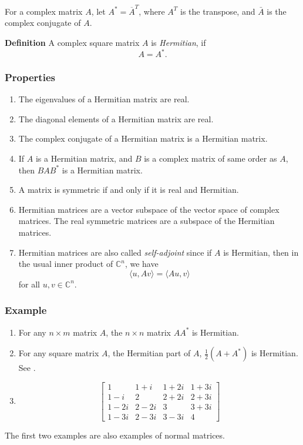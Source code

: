 \documentclass[12pt]{article}
\begin{document}
For a complex matrix $A$, let $A^\ast=\overline{A}^{T}$, where 
$A^T$ is the transpose, and $\bar{A}$ is the complex conjugate of $A$.

{\bf Definition}
A complex square matrix $A$ is \emph{Hermitian}, if 
$$ A = A^*. $$

\subsubsection*{Properties}
\begin{enumerate}
\item The eigenvalues of a Hermitian matrix are real.
\item The diagonal elements of a Hermitian matrix are real.
\item The complex conjugate of a Hermitian matrix is a Hermitian matrix.
\item If $A$ is a Hermitian matrix, and $B$ is a complex matrix
of same order as $A$, then $BAB^\ast$ is a Hermitian matrix.
\item A matrix is symmetric if and only if it is real and Hermitian.
\item Hermitian matrices are a vector subspace of the vector space of 
complex matrices. 
The real symmetric matrices are a subspace of the Hermitian matrices.
\item Hermitian matrices are also called \emph{self-adjoint} since if $A$ is
Hermitian, then in the usual
inner product of $\mathbb{C}^n$, we have 
$$ \langle u,Av \rangle = \langle Au,v\rangle$$
for all $u,v\in \mathbb{C}^n$.

\end{enumerate}

\subsubsection*{Example}
\begin{enumerate}
\item For any $n\times m$ matrix $A$, the $n\times n$ matrix $A A^\ast$ is
Hermitian. 
\item For any square matrix $A$, the Hermitian part of $A$,  
      $\frac{1}{2}(A+A^\ast)$ is Hermitian. 
      See .
\item 
$$ \begin{bmatrix}
  1 & 1 + i & 1 + 2i & 1 + 3i \\
  1 - i & 2 & 2 + 2i & 2 + 3i \\
  1 - 2i & 2 - 2i & 3 & 3 + 3i \\
  1 - 3i & 2 - 3i & 3 - 3i & 4
\end{bmatrix} $$
\end{enumerate}
The first two examples are also examples of normal matrices.
\end{document}

